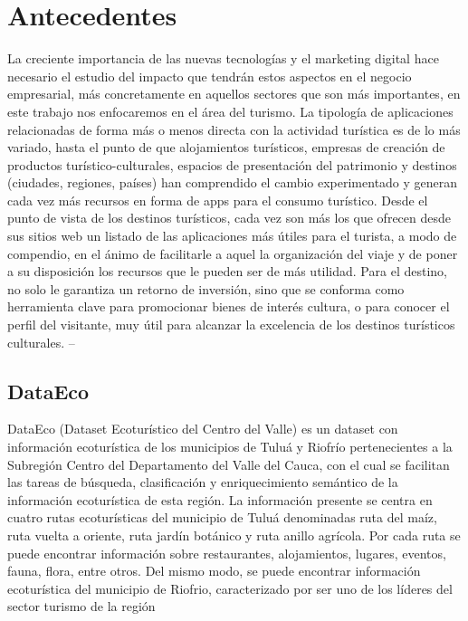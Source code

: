 \documentclass[12pt,letterpaper,openany]{book}
\begin{document}
\section{Antecedentes}
La creciente importancia de las nuevas tecnologías y el marketing digital hace necesario el estudio del impacto que tendrán estos aspectos en el negocio empresarial, más concretamente en aquellos sectores que son más importantes, en este trabajo nos enfocaremos en el área del turismo.
La tipología de aplicaciones relacionadas de forma más o menos directa con la actividad turística es de lo más variado, hasta el punto de que alojamientos turísticos, empresas de creación de productos turístico-culturales, espacios de presentación del patrimonio y destinos (ciudades, regiones, países) han comprendido el cambio experimentado y generan cada vez más recursos en forma de apps para el consumo turístico. 
Desde el punto de vista de los destinos turísticos, cada vez son más los que ofrecen desde sus sitios web un listado de las aplicaciones más útiles para el turista, a modo de compendio, en el ánimo de facilitarle a aquel la organización del viaje y de poner a su disposición los recursos que le pueden ser de más utilidad.
Para el destino, no solo le garantiza un retorno de inversión, sino que se conforma como herramienta clave para promocionar bienes de interés cultura, o para conocer el perfil del visitante, muy útil para alcanzar la excelencia de los destinos turísticos culturales. \cite{19}–\cite{21}

\subsection{DataEco\cite{22}}
DataEco (Dataset Ecoturístico del Centro del Valle) es un dataset con información ecoturística de los municipios de Tuluá y Riofrío pertenecientes a la Subregión Centro del Departamento del Valle del Cauca, con el cual se facilitan las tareas de búsqueda, clasificación y enriquecimiento semántico de la información ecoturística de esta región.
La información presente se centra en cuatro rutas ecoturísticas del municipio de Tuluá denominadas ruta del maíz, ruta vuelta a oriente, ruta jardín botánico y ruta anillo agrícola. Por cada ruta se puede encontrar información sobre restaurantes, alojamientos, lugares, eventos, fauna, flora, entre otros.
Del mismo modo, se puede encontrar información ecoturística del municipio de Riofrio, caracterizado por ser uno de los líderes del sector turismo de la región
\end{document}
